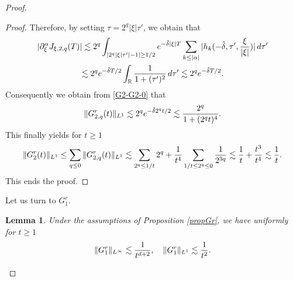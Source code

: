 \documentclass[11pt]{amsart}
\numberwithin{equation}{section}
\newtheorem{lem}{Lemma}[section]
\begin{document}
\begin{proof}
\begin{proof}
         Therefore, by setting $\tau= 2^q | \xi|  \tau'$, we obtain
     that
   \begin{multline*}  | \partial_{\xi}^\alpha J_{\xi, 2, q}(T) | \lesssim  2^q  \int_{ | 2^q | \xi| \tau' | - 1| \geq 1/2 }e^{- \tilde \delta |\xi| T} 
         \sum_{k \leq | \alpha |} | h_{k} ( - \tilde \delta,  \tau',  
     {\xi \over |\xi| } )  |\, d\tau' \\  \lesssim   2^q  e^{-  \tilde \delta T/2}   \int_{\mathbb{R}} { 1 \over 1 + (\tau')^2 } \, d\tau'
      \lesssim  2^q  e^{-  \tilde \delta T/2}.
      \end{multline*}
 Consequently we obtain from \eqref{G2-G2-0} that
 $$ \|G^r_{2,q}  (t) \|_{L^1} \lesssim  2^q  e^{-  \tilde \delta 2^q t/2} \lesssim { 2^q \over 1 + (2^qt)^4}.$$
  This finally yields for $t \geq 1$
$$
\|G^r_{2} (t) \|_{L^1} \leq \sum_{q \leq 0} \| G^r_{2,q}  (t) \|_{L^1}  \lesssim \sum_{ 2^q \leq 1/t}  2^q
 + {1 \over t^4} \sum_{ 1/t \leq 2^q \leq 0}  { 1 \over 2^{3q}}
  \lesssim { 1 \over t}+ {t^3 \over t^4} \lesssim {1 \over t}.
  $$
   This ends the proof. 
   \end{proof}  
    Let us turn to $G^r_{1}$.
   \begin{lem}
   Under the assumptions of Proposition \ref{propGr},     we have uniformly for $t \geq 1$
    $$ \| G^r_{1} \|_{L^\infty} \lesssim {1 \over t^{d+2}}, \quad   \| G^r_{1} \|_{L^1} \lesssim {1 \over t^{2}}.$$
   \label{lemGr1}
   \end{lem}
   


\end{proof}
\end{document}
